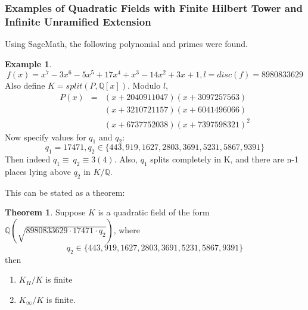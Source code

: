\documentclass[12pt]{extarticle}
\newcommand{\Q}{\mathbb{Q}}
\newcommand{\<}{\langle}
\renewcommand{\>}{\rangle}
\theoremstyle{definition}
\newtheorem{theorem}{Theorem}
\newtheorem*{example}{Example}
\begin{document}
\subsubsection*{Examples of Quadratic Fields with Finite Hilbert Tower and Infinite Unramified Extension}
Using SageMath, the following polynomial and primes were found. 
\begin{example}
\begin{equation}
    f(x) = x^7-3x^6-5x^5+17x^4+x^3-14x^2+3x+1, l= disc(f)=8980833629
\end{equation}
Also define $K=split(P,\Q[x])$. Modulo $l$,
\begin{eqnarray*}
        P(x)&=&(x+2040911047)(x+3097257563)\\ & & {} (x+3210721157)(x+6041496066)\\ & & {}(x+6737752038)(x+7397598321)^2
\end{eqnarray*}
Now specify values for $q_1$ and $q_2$:
\begin{equation}
    q_1=17471,q_2\in\{443,919,1627,2803,3691,5231,5867,9391\}
\end{equation}
Then indeed $q_1\equiv\:q_2\equiv3(4)$. Also, $q_1$ splits completely in K, and there are n-1 places lying above $q_2$ in $K/\Q$.
\end{example}
This can be stated as a theorem:
\begin{theorem}
    Suppose $K$ is a quadratic field of the form $\Q(\sqrt{8980833629 \cdot 17471 \cdot q_2})$, where 
    \begin{equation}
        q_2\in\{443,919,1627,2803,3691,5231,5867,9391\}
    \end{equation}
    then \begin{enumerate}
        \item $K_H/K$ is finite
        \item $K_\infty/K$ is finite.
    \end{enumerate}
\end{theorem}
\end{document}
